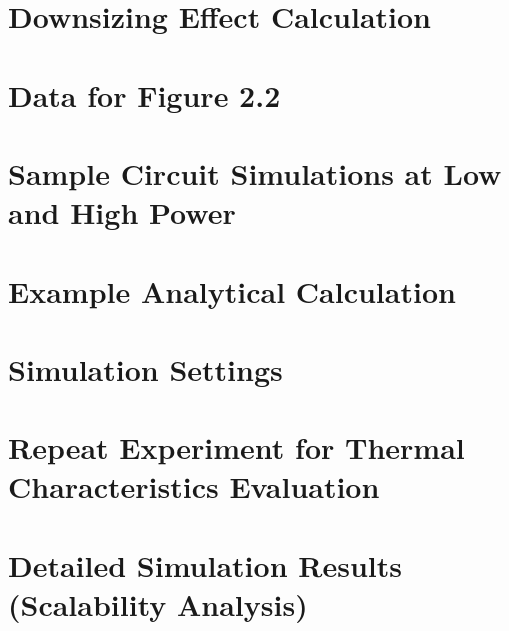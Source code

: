 \documentclass[12pt]{report}
\begin{document}
\singlespacing
\printbibliography[heading=bibintoc,title={Bibliography}]
\doublespacing
\clearpage
{}
{} 

\appendix %
\chapter{Downsizing Effect Calculation}\label{app:downsizing}


\singlespacing
{}
\chapter{Data for Figure 2.2}\label{app:converter_trends}

\doublespacing
{}
\chapter{Sample Circuit Simulations at Low and High Power}\label{app:simulation}


\chapter{Example Analytical Calculation}\label{app:model}


\chapter{Simulation Settings}\label{app:ansys}


\chapter{Repeat Experiment for Thermal Characteristics Evaluation}\label{app:longresult}


\chapter{Detailed Simulation Results (Scalability Analysis)}\label{app:detailedsim}

\end{document}
